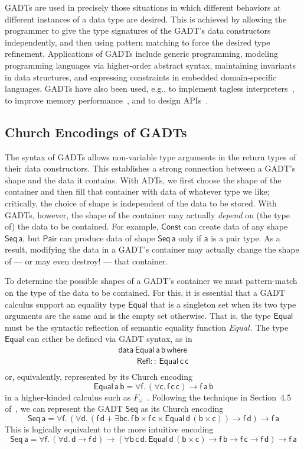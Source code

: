 \documentclass[acmsmall,screen,review,anonymous]{acmart}
\theoremstyle{definition}
\begin{document}
GADTs are used in precisely those situations in which different
behaviors at different instances of a data type are desired. This is
achieved by allowing the programmer to give the type signatures of the
GADT's data constructors independently, and then using pattern
matching to force the desired type refinement. Applications of GADTs
include generic programming, modeling programming languages via
higher-order abstract syntax, maintaining invariants in data
structures, and expressing constraints in embedded domain-specific
languages. GADTs have also been used, e.g., to implement tagless
interpreters~\cite{pl04,pr06,pvww06}, to improve memory
performance~\cite{min15}, and to design APIs~\cite{pen20}.

\subsection{Church Encodings of GADTs}\label{sec:CEs}

The syntax of GADTs allows non-variable type arguments in the return
types of their data constructors. This establishes a strong connection
between a GADT's shape and the data it contains. With ADTs, we first
choose the shape of the container and then fill that container with
data of whatever type we like; critically, the choice of shape is
independent of the data to be stored. With GADTs, however, the shape
of the container may actually {\em depend} on (the type of) the data
to be contained. For example, $\mathsf{Const}$ can create data of any
shape $\mathsf{Seq\,a}$, but $\mathsf{Pair}$ can produce data of shape
$\mathsf{Seq\,a}$ only if $\mathsf{a}$ is a pair type. As a result,
modifying the data in a GADT's container may actually change the shape
of --- or may even destroy! --- that container.

To determine the possible shapes of a GADT's container we must
pattern-match on the type of the data to be contained. For this, it is
essential that a GADT calculus support an equality type
$\mathsf{Equal}$ that is a singleton set when its two type arguments
are the same and is the empty set otherwise. That is, the type
$\mathsf{Equal}$ must be the syntactic reflection of semantic equality
function $\mathit{Equal}$. The type $\mathsf{Equal}$ can either be
defined via GADT syntax, as in
\[\begin{array}{l}
\mathsf{data\, Equal\,a\,b\,where}\\
\mathsf{\;\;\;\;\;\;\;\;Refl ::\, Equal\,c\,c}\\
\end{array}\]
\noindent
or, equivalently, represented by its Church encoding
\[\mathsf{Equal\,a\,b} = \mathsf{\forall f.\, (\forall c.\,
  f\,c\,c) \to f\,a\,b}\] in a higher-kinded calculus such as
$F_\omega$~\cite{atk12}. Following the technique in Section~4.5
of~\cite{atk12}, we can represent the GADT $\mathsf{Seq}$ as its
Church encoding
\[\mathsf{Seq\,a} = \mathsf{\forall f.\,(\forall d. \,(f\,d + \exists b
  c.\, f\, b \times f \,c \times \mathsf{Equal}\, d \,(b \times c))
  \to f \,d) \to f\, a}\]
This is logically equivalent to the more intuitive encoding
\[\mathsf{Seq\,a} = \mathsf{\forall f.\, (\forall d.\,d \to f\, d)
  \to (\forall b\,c\,d.\,Equal\,d\,(b\times c) \to f\,b \to f\,c \to
  f\,d) \to f\,a}\]
\end{document}
